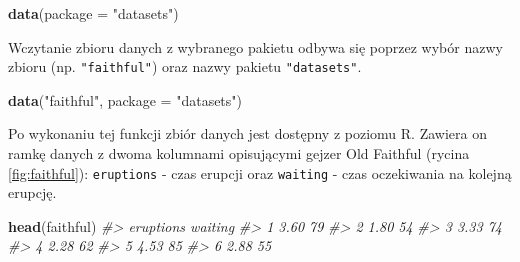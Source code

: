 \documentclass[paper=6in:9in,pagesize=pdftex,headinclude=on,footinclude=on,10pt]{scrbook}
\newenvironment{Shaded}{\begin{snugshade}}{\end{snugshade}}
\newcommand{\CommentTok}[1]{\textcolor[rgb]{0.56,0.35,0.01}{\textit{#1}}}
\newcommand{\DataTypeTok}[1]{\textcolor[rgb]{0.13,0.29,0.53}{#1}}
\newcommand{\KeywordTok}[1]{\textcolor[rgb]{0.13,0.29,0.53}{\textbf{#1}}}
\newcommand{\NormalTok}[1]{#1}
\newcommand{\StringTok}[1]{\textcolor[rgb]{0.31,0.60,0.02}{#1}}
\begin{document}
\begin{Shaded}
\begin{Highlighting}[]
\KeywordTok{data}\NormalTok{(}\DataTypeTok{package =} \StringTok{"datasets"}\NormalTok{)}
\end{Highlighting}
\end{Shaded}

Wczytanie zbioru danych z wybranego pakietu odbywa się poprzez wybór nazwy zbioru (np. \texttt{"faithful"}) oraz nazwy pakietu \texttt{"datasets"}.

\begin{Shaded}
\begin{Highlighting}[]
\KeywordTok{data}\NormalTok{(}\StringTok{"faithful"}\NormalTok{, }\DataTypeTok{package =} \StringTok{"datasets"}\NormalTok{)}
\end{Highlighting}
\end{Shaded}

Po wykonaniu tej funkcji zbiór danych jest dostępny z poziomu R.
Zawiera on ramkę danych z dwoma kolumnami opisującymi gejzer Old Faithful (rycina \ref{fig:faithful}): \texttt{eruptions} - czas erupcji oraz \texttt{waiting} - czas oczekiwania na kolejną erupcję.

\begin{Shaded}
\begin{Highlighting}[]
\KeywordTok{head}\NormalTok{(faithful)}
\CommentTok{#>   eruptions waiting}
\CommentTok{#> 1      3.60      79}
\CommentTok{#> 2      1.80      54}
\CommentTok{#> 3      3.33      74}
\CommentTok{#> 4      2.28      62}
\CommentTok{#> 5      4.53      85}
\CommentTok{#> 6      2.88      55}
\end{Highlighting}
\end{Shaded}
\end{document}
